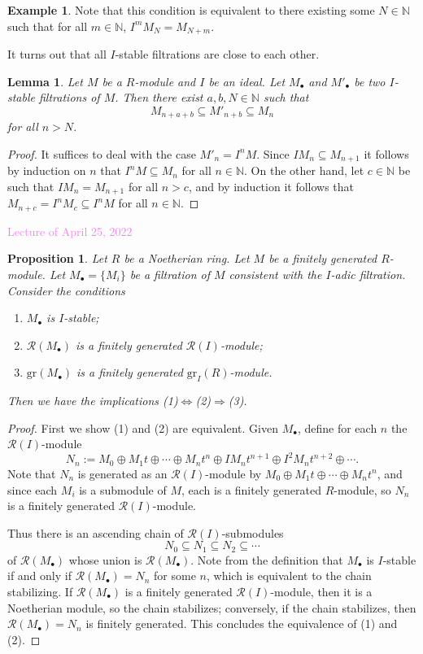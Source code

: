 \documentclass{amsart}[12pt]
\newcommand{\Apr}[1]{\textcolor{violet}{Lecture of April #1, 2022}}
\newcommand{\N}{\mathbb{N}}
\numberwithin{equation}{section}
\theoremstyle{plain} %
\newtheorem{lemma}[equation]{Lemma}
\newtheorem{prop}[equation]{Proposition}
\theoremstyle{definition}
\newtheorem{ex}[equation]{Example}
\theoremstyle{remark}
\newcommand{\gr}{\mathrm{gr}}
\begin{document}
\begin{ex}
Note that this condition is equivalent to there existing some $N\in \N$ such that for all $m\in \N$, $I^m M_N = M_{N+m}$.

It turns out that all $I$-stable filtrations are close to each other.

\begin{lemma} Let $M$ be a $R$-module and $I$ be an ideal. Let $M_\bullet$ and $M'_\bullet$ be two $I$-stable filtrations of $M$. Then there exist $a,b,N\in \N$ such that
\[ M_{n+a+b} \subseteq M'_{n+b} \subseteq M_{n} \] 
for all $n>N$.
\end{lemma}
\begin{proof} It suffices to deal with the case $M'_n = I^n M$. Since $I M_n \subseteq M_{n+1}$ it follows by induction on $n$ that $I^n M \subseteq M_n$ for all $n\in \N$. On the other hand, let $c\in \N$ be such that $I M_n = M_{n+1}$ for all $n> c$, and by induction it follows that $M_{n+c} = I^n M_c \subseteq I^n M$ for all $n\in \N$.
\end{proof}

\Apr{25}


\begin{prop} Let $R$ be a Noetherian ring. Let $M$ be a finitely generated $R$-module. Let $M_{\bullet} = \{M_i\}$ be a filtration of $M$ consistent with the $I$-adic filtration. Consider the conditions
\begin{enumerate}
\item $M_{\bullet}$ is $I$-stable;
\item $\mathcal{R}(M_{\bullet})$ is a finitely generated $\mathcal{R}(I)$-module;
\item $\gr(M_{\bullet})$ is a finitely generated $\gr_I(R)$-module.
\end{enumerate}
Then we have the implications (1)$\Leftrightarrow$(2)$\Rightarrow$(3).
\end{prop}
\begin{proof}
First we show (1) and (2) are equivalent. Given $M_\bullet$, define for each $n$ the $\mathcal{R}(I)$-module
\[ N_n := M_0 \oplus M_1 t \oplus \cdots \oplus M_n t^n \oplus  I M_{n} t^{n+1} \oplus  I^2 M_{n} t^{n+2} \oplus \cdots.\]
Note that $N_n$ is generated as an $\mathcal{R}(I)$-module by $M_0 \oplus M_1 t \oplus \cdots \oplus M_n t^n$, and since each $M_i$ is a submodule of $M$, each is a finitely generated $R$-module, so $N_n$ is a finitely generated $\mathcal{R}(I)$-module.

Thus there is an ascending chain of $\mathcal{R}(I)$-submodules
\[ N_0 \subseteq N_1 \subseteq N_2 \subseteq \cdots \]
of $\mathcal{R}(M_{\bullet})$ whose union is $\mathcal{R}(M_{\bullet})$. Note from the definition that $M_\bullet$ is $I$-stable if and only if $\mathcal{R}(M_{\bullet}) = N_n$ for some $n$, which is equivalent to the chain stabilizing. If $\mathcal{R}(M_{\bullet})$ is a finitely generated $\mathcal{R}(I)$-module, then it is a Noetherian module, so the chain stabilizes; conversely, if the chain stabilizes, then $\mathcal{R}(M_{\bullet}) = N_n$ is finitely generated. This concludes the equivalence of (1) and (2).


\end{proof}
\end{ex}
\end{document}
